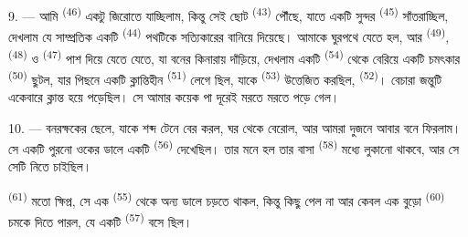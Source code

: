 9. --- আমি  \textsuperscript{(46)} একটু জিরোতে যাচ্ছিলাম,
কিন্তু সেই ছোট  \textsuperscript{(43)} পৌঁছে, যাতে একটি সুন্দর
 \textsuperscript{(45)} সাঁতরাচ্ছিল, দেখলাম যে সাম্প্রতিক একটি
 \textsuperscript{(44)} পথটিকে সত্যিকারের  বানিয়ে
দিয়েছে। আমাকে ঘুরপথে যেতে হল, আর  \textsuperscript{(49)},
 \textsuperscript{(48)} ও  \textsuperscript{(47)} পাশ
দিয়ে যেতে যেতে, যা বনের কিনারায় দাঁড়িয়ে, দেখলাম একটি 
\textsuperscript{(54)} থেকে বেরিয়ে একটি চমৎকার  \textsuperscript{(50)}
ছুটল, যার পিছনে একটি ক্লান্তিহীন 
\textsuperscript{(51)} লেগে ছিল, যাকে  \textsuperscript{(53)}
উত্তেজিত করছিল,  \textsuperscript{(52)}। বেচারা
জন্তুটি একেবারে ক্লান্ত হয়ে পড়েছিল। সে আমার কয়েক পা দূরেই মরতে মরতে পড়ে
গেল।

10. --- বনরক্ষকের ছেলে, যাকে  শব্দ টেনে বের করল, ঘর থেকে
বেরোল, আর আমরা দুজনে আবার বনে ফিরলাম। সে একটি পুরনো ওকের ডালে একটি
 \textsuperscript{(56)} দেখেছিল। তার মনে হল তার বাসা
 \textsuperscript{(58)} মধ্যে লুকানো থাকবে, আর সে সেটি নিতে
চাইছিল।

 \textsuperscript{(61)} মতো ক্ষিপ্র, সে এক 
\textsuperscript{(55)} থেকে অন্য ডালে চড়তে থাকল, কিন্তু কিছু পেল না আর কেবল এক
বুড়ো  \textsuperscript{(60)} চমকে দিতে পারল, যে একটি
 \textsuperscript{(57)} বসে ছিল।
\VUsaut{4.0mm}
\VUfilet{22mm}
